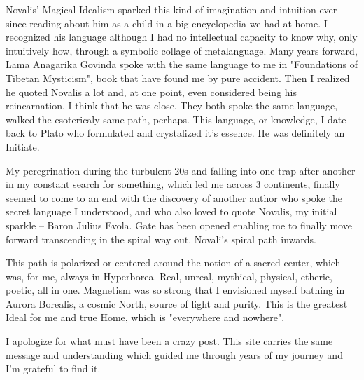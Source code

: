 \begin{footnotesize}
\begin{sffamily}
Novalis' Magical Idealism sparked this kind of imagination and intuition ever since reading about him as a child in a big encyclopedia we had at home. I recognized his language although I had no intellectual capacity to know why, only intuitively how, through a symbolic collage of metalanguage. Many years forward, Lama Anagarika Govinda spoke with the same language to me in "Foundations of Tibetan Mysticism", book that have found me by pure accident. Then I realized he quoted Novalis a lot and, at one point, even considered being his reincarnation. I think that he was close. They both spoke the same language, walked the esotericaly same path, perhaps. This language, or knowledge, I date back to Plato who formulated and crystalized it's essence. He was definitely an Initiate.

My peregrination during the turbulent 20s and falling into one trap after another in my constant search for something, which led me across 3 continents, finally seemed to come to an end with the discovery of another author who spoke the secret language I understood, and who also loved to quote Novalis, my initial sparkle – Baron Julius Evola. Gate has been opened enabling me to finally move forward transcending in the spiral way out. Novali's spiral path inwards.

This path is polarized or centered around the notion of a sacred center, which was, for me, always in Hyperborea. Real, unreal, mythical, physical, etheric, poetic, all in one. Magnetism was so strong that I envisioned myself bathing in Aurora Borealis, a cosmic North, source of light and purity. This is the greatest Ideal for me and true Home, which is "everywhere and nowhere".

I apologize for what must have been a crazy post. This site carries the same message and understanding which guided me through years of my journey and I'm grateful to find it.


\end{sffamily}\end{footnotesize}
